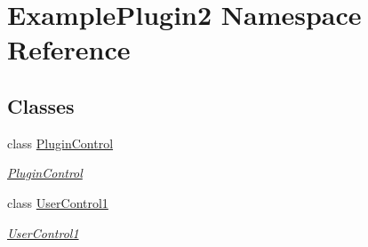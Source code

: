 \hypertarget{namespace_example_plugin2}{}\section{Example\+Plugin2 Namespace Reference}
\label{namespace_example_plugin2}
\subsection*{Classes}
\begin{DoxyCompactItemize}
\item 
class \mbox{\hyperlink{class_example_plugin2_1_1_plugin_control}{Plugin\+Control}}
\begin{DoxyCompactList}\small\item\em \mbox{\hyperlink{class_example_plugin2_1_1_plugin_control}{Plugin\+Control}} \end{DoxyCompactList}\item 
class \mbox{\hyperlink{class_example_plugin2_1_1_user_control1}{User\+Control1}}
\begin{DoxyCompactList}\small\item\em \mbox{\hyperlink{class_example_plugin2_1_1_user_control1}{User\+Control1}} \end{DoxyCompactList}\end{DoxyCompactItemize}
